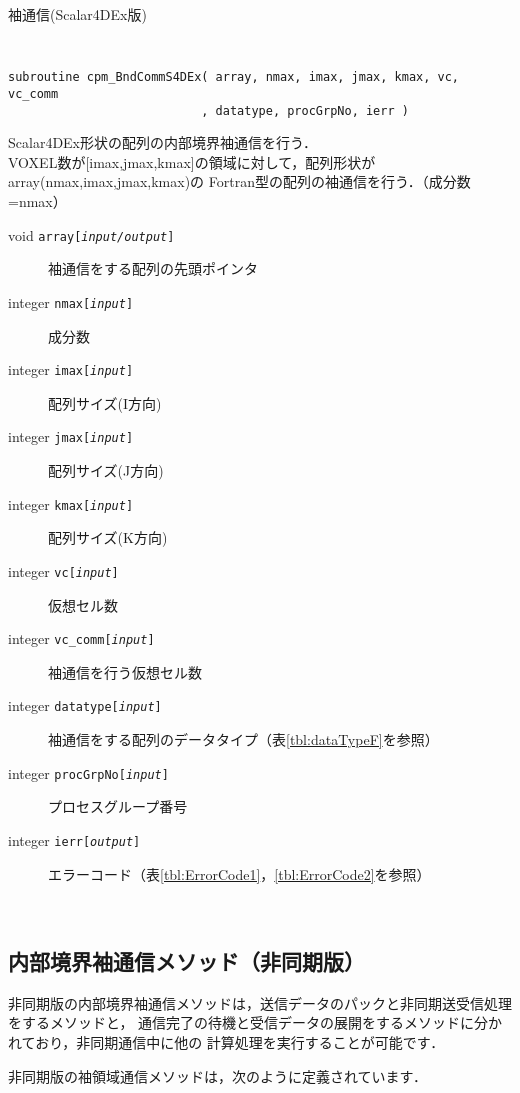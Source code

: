 \begin{spacing}{0.8}
\begin{itembox}[l]{袖通信(Scalar4DEx版)}
{\tt
\begin{verbatim}
subroutine cpm_BndCommS4DEx( array, nmax, imax, jmax, kmax, vc, vc_comm
                           , datatype, procGrpNo, ierr )
\end{verbatim}
}
Scalar4DEx形状の配列の内部境界袖通信を行う．\\
VOXEL数が[imax,jmax,kmax]の領域に対して，配列形状がarray(nmax,imax,jmax,kmax)の
Fortran型の配列の袖通信を行う．（成分数=nmax）
\begin{description}
\item[void    {\tt array[{\it input/output}]}] 袖通信をする配列の先頭ポインタ
\item[integer {\tt nmax[{\it input}]}] 成分数
\item[integer {\tt imax[{\it input}]}] 配列サイズ(I方向)
\item[integer {\tt jmax[{\it input}]}] 配列サイズ(J方向)
\item[integer {\tt kmax[{\it input}]}] 配列サイズ(K方向)
\item[integer {\tt vc[{\it input}]}] 仮想セル数
\item[integer {\tt vc\_comm[{\it input}]}] 袖通信を行う仮想セル数
\item[integer {\tt datatype[{\it input}]}] 袖通信をする配列のデータタイプ（表\ref{tbl:dataTypeF}を参照）
\item[integer {\tt procGrpNo[{\it input}]}] プロセスグループ番号
\item[integer {\tt ierr[{\it output}]}] エラーコード（表\ref{tbl:ErrorCode1}，\ref{tbl:ErrorCode2}を参照）
\end{description}
\end{itembox}\\
\end{spacing}


\clearpage


\subsection{内部境界袖通信メソッド（非同期版）}
\label{HbndcommF}
非同期版の内部境界袖通信メソッドは，送信データのパックと非同期送受信処理をするメソッドと，
通信完了の待機と受信データの展開をするメソッドに分かれており，非同期通信中に他の
計算処理を実行することが可能です．

非同期版の袖領域通信メソッドは，次のように定義されています．\\

